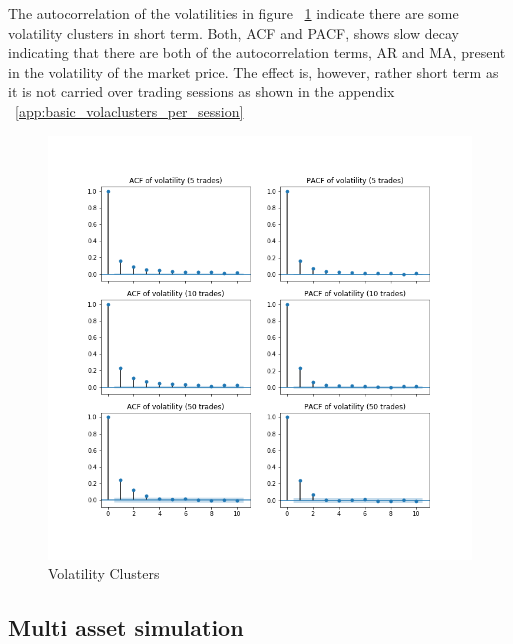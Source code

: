 The autocorrelation of the volatilities in figure ~\ref{fig:basic_volaclusters}
indicate there are some volatility clusters in short term. Both, ACF and PACF, shows slow
decay indicating that there are both of the autocorrelation terms, AR and MA,
present in the volatility of the market price. The effect is, however, rather short term
as it is not carried over trading sessions as shown in the appendix ~\ref{app:basic_volaclusters_per_session}


\begin{figure}
    \includegraphics[width=\linewidth]{plots/basic_volaclusters_intraday.png}
    \caption{Volatility Clusters}
    \label{fig:basic_volaclusters}
\end{figure}

\subsection{Multi asset simulation}
